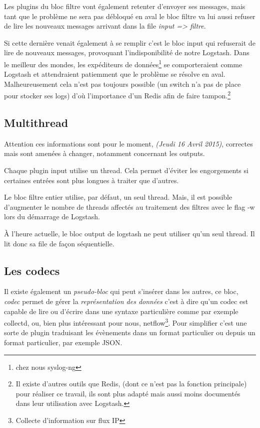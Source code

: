 Les plugins du bloc filtre vont également retenter d'envoyer ses messages, mais tant
que le problème ne sera pas débloqué en aval le bloc filtre va lui aussi 
refuser de lire les nouveaux messages arrivant dans la file \textit{input => filtre}.

Si cette dernière venait également à se remplir c'est le bloc input qui refuserait
de lire de nouveaux messages, provoquant l'indisponibilité de notre Logstash.
Dans le meilleur des mondes, les expéditeurs de données\footnote{chez nous syslog-ng} 
se comporteraient comme Logstash et attendraient patiemment que le problème se résolve 
en aval. Malheureusement cela n'est pas toujours possible (un switch n'a pas de place 
pour stocker ses logs) d'où l'importance d'un Redis afin de faire tampon.\footnote{Il 
existe d'autres outils que Redis, (dont ce n'est pas la fonction
principale) pour réaliser ce travail, ils sont plus adapté mais aussi moins documentés
dans leur utilisation avec Logstash.}

\subsection{Multithread}
\label{subsec:logstashmultithread}
{\footnotesize Attention ces informations sont pour le moment, \textit{(Jeudi 16 
Avril 2015)}, correctes mais sont amenées à changer, notamment concernant les outputs.}

Chaque plugin input utilise un thread. Cela permet d'éviter les engorgements si  
certaines entrées sont plus longues à traiter que d'autres.

Le bloc filtre entier utilise, par défaut, un seul thread. Mais, il est possible 
d'augmenter le nombre de threads affectés au traitement des filtres avec le \gls{flag}
-w lors du démarrage de Logstash.

À l'heure actuelle, le bloc output de logstash ne peut utiliser qu'un seul thread.
Il lit donc sa file de façon séquentielle. 
\subsection{Les codecs}
\label{subsec:logstashcodec}
Il existe également un \textit{pseudo-bloc} qui peut s'insérer dans les autres, ce 
bloc, \emph{codec} permet de gérer la \textit{représentation des données} c'est 
à dire qu'un codec est capable de lire ou d'écrire dans une syntaxe particulière 
comme par exemple collectd, ou, bien plus intéressant pour nous, netflow\footnote{Collecte d'information sur flux IP }. Pour simplifier c'est une sorte de plugin traduisant les évènements dans un format particulier ou depuis un format particulier, par exemple JSON.

